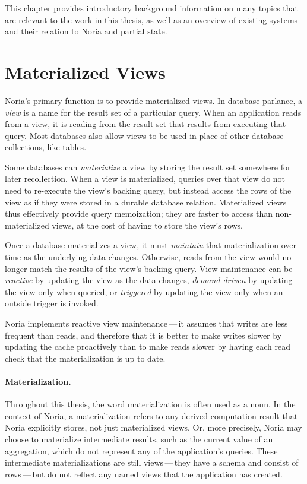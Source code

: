 This chapter provides introductory background information on many topics that
are relevant to the work in this thesis, as well as an overview of existing
systems and their relation to Noria and partial state.

\section{Materialized Views}

Noria's primary function is to provide materialized views. In database parlance,
a \textit{view} is a name for the result set of a particular query. When an
application reads from a view, it is reading from the result set that results
from executing that query. Most databases also allow views to be used in place
of other database collections, like tables.

Some databases can \textit{materialize} a view by storing the result set
somewhere for later recollection. When a view is materialized, queries over that
view do not need to re-execute the view's backing query, but instead access the
rows of the view as if they were stored in a durable database relation.
Materialized views thus effectively provide query memoization; they are faster
to access than non-materialized views, at the cost of having to store the view's
rows.

Once a database materializes a view, it must \textit{maintain} that
materialization over time as the underlying data changes. Otherwise, reads from
the view would no longer match the results of the view's backing query. View
maintenance can be \emph{reactive} by updating the view as the data changes,
\emph{demand-driven} by updating the view only when queried, or \emph{triggered}
by updating the view only when an outside trigger is invoked.

Noria implements reactive view maintenance\,---\,it assumes that writes are less
frequent than reads, and therefore that it is better to make writes slower by
updating the cache proactively than to make reads slower by having each read
check that the materialization is up to date.

\paragraph{Materialization.}
Throughout this thesis, the word materialization is often used as a noun. In the
context of Noria, a materialization refers to any derived computation result
that Noria explicitly stores, not just materialized views. Or, more precisely,
Noria may choose to materialize intermediate results, such as the current value
of an aggregation, which do not represent any of the application's queries.
These intermediate materializations are still views\,---\,they have a schema and
consist of rows\,---\,but do not reflect any named views that the application
has created.

